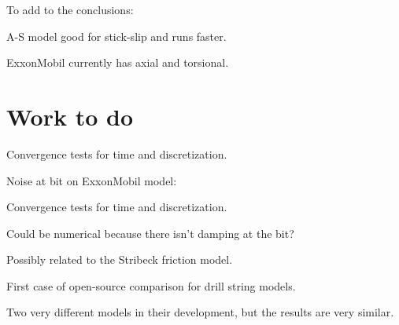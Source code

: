 To add to the conclusions:
\begin{bulletedlist}
	\item A-S model good for stick-slip and runs faster.
	\item ExxonMobil currently has axial and torsional.
\end{bulletedlist}

\section{Work to do}
\begin{bulletedlist}
	\item Convergence tests for time and discretization.
\end{bulletedlist}

Noise at bit on ExxonMobil model:
\begin{bulletedlist}
	\item Convergence tests for time and discretization.
	\item Could be numerical because there isn't damping at the bit?
	\item Possibly related to the Stribeck friction model.
\end{bulletedlist}

First case of open-source comparison for drill string models.

Two very different models in their development, but the results are very similar. 




